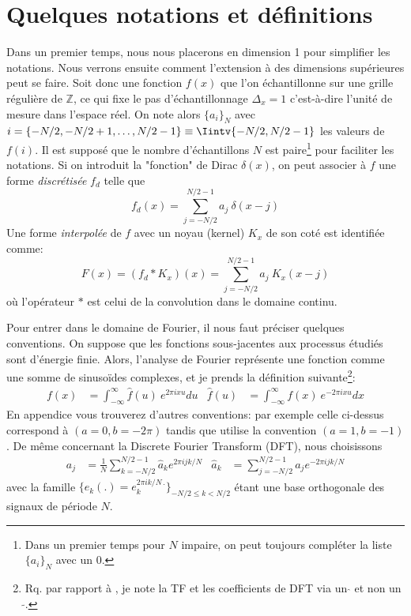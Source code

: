 \documentclass[11pt,twoside]{article}
\begin{document}
\section{Quelques notations et définitions}
\label{sec:Def}
%
Dans un premier temps, nous nous placerons en dimension 1 pour simplifier les notations. Nous verrons ensuite comment l'extension à des dimensions supérieures peut se faire. Soit donc une fonction $f(x)$ que l'on échantillonne sur une grille régulière de $\mathbb{Z}$, ce qui fixe le pas d'échantillonnage $\Delta_x=1$ c'est-à-dire l'unité de mesure dans l'espace réel. On note alors $\{a_i\}_N$ avec $i=\{-N/2,-N/2+1,\dots,N/2-1\}\equiv\Iintv{-N/2,N/2-1}$ les valeurs de $f(i)$. Il est supposé que le nombre d'échantillons $N$ est paire\footnote{Dans un premier temps pour $N$ impaire, on peut toujours compléter la liste  $\{a_i\}_N$ avec un 0.} pour faciliter les notations. Si on introduit la "fonction" de Dirac $\delta(x)$, on peut associer à $f$ une forme \textit{discrétisée} $f_d$ telle que
\begin{equation}
f_d(x) = \sum_{j=-N/2}^{N/2-1} a_j\ \delta(x-j)
\label{eq:fdreal}
\end{equation}
Une forme \textit{interpolée} de $f$ avec un noyau (kernel) $K_x$ de son coté est identifiée comme:
\begin{equation}
F(x) = (f_d \ast K_x)(x) = \sum_{j=-N/2}^{N/2-1} a_j\ K_x(x-j)
\label{eq:Freal}
\end{equation}
où l'opérateur $\ast$ est celui de la convolution dans le domaine continu. 

Pour entrer dans le domaine de Fourier, il nous faut préciser quelques conventions. On suppose que les fonctions sous-jacentes aux processus étudiés sont d'énergie finie. Alors, l'analyse de Fourier représente une fonction comme une somme de sinusoïdes complexes, et je prends la définition suivante\footnote{Rq. par rapport à \citep{2014PASP..126..287B}, je note la TF et les coefficients de DFT via un $\hat{}$ et non un $\tilde{}$.}: 
\begin{align}
f(x) &= \int_{-\infty}^\infty \hat{f}(u)\ e^{2\pi i xu} du &
\hat{f}(u) &= \int_{-\infty}^\infty f(x)\ e^{-2\pi i xu} dx 
\label{eq:TF}
\end{align}
En appendice vous trouverez d'autres conventions: par exemple celle ci-dessus correspond à $(a=0, b=-2\pi)$ tandis que \cite{10.5555/1525499} utilise la convention $(a=1, b=-1)$. De même concernant la Discrete Fourier Transform (DFT), nous choisissons
\begin{align}
a_j &= \frac{1}{N}\sum_{k=-N/2}^{N/2-1} \hat{a}_k e^{2\pi i jk/N} &
\hat{a}_k &= \sum_{j=-N/2}^{N/2-1} a_j e^{-2\pi i jk/N}
\label{eq:DFT}
\end{align}
avec la famille $\{e_k(.)=e^{2\pi i k/N\, .}_k \}_{-N/2 \leq k<N/2}$ étant une base orthogonale des signaux de période $N$.
%
\end{document}
